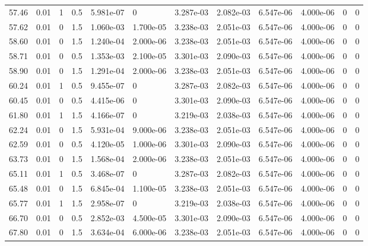 \documentclass[preview]{standalone}
\begin{document}
{{{\begin{tabular}{L{1.2cm}C{1.2cm} C{0.3cm}C{0.5cm} C{1.4cm}C{1.4cm} C{1.4cm}C{1.4cm} C{1.6cm}C{1.6cm} C{1.6cm}C{1.6cm}}
  57.46  &  0.01  & 1     & 0.5 &  5.981e-07  & 0  &  3.287e-03&   2.082e-03& 6.547e-06 & 4.000e-06   &  0 & 0  \\ 
  57.62  &  0.01  & 0     & 1.5 &  1.060e-03  & 1.700e-05  &  3.238e-03&   2.051e-03& 6.547e-06 & 4.000e-06   &  0 & 0  \\ 
  58.60  &  0.01  & 0     & 1.5 &  1.240e-04  & 2.000e-06  &  3.238e-03&   2.051e-03& 6.547e-06 & 4.000e-06   &  0 & 0  \\ 
  58.71  &  0.01  & 0     & 0.5 &  1.353e-03  & 2.100e-05  &  3.301e-03&   2.090e-03& 6.547e-06 & 4.000e-06   &  0 & 0  \\ 
  58.90  &  0.01  & 0     & 1.5 &  1.291e-04  & 2.000e-06  &  3.238e-03&   2.051e-03& 6.547e-06 & 4.000e-06   &  0 & 0  \\ 
  60.24  &  0.01  & 1     & 0.5 &  9.455e-07  & 0  &  3.287e-03&   2.082e-03& 6.547e-06 & 4.000e-06   &  0 & 0  \\ 
  60.45  &  0.01  & 0     & 0.5 &  4.415e-06  & 0  &  3.301e-03&   2.090e-03& 6.547e-06 & 4.000e-06   &  0 & 0  \\ 
  61.80  &  0.01  & 1     & 1.5 &  4.166e-07  & 0  &  3.219e-03&   2.038e-03& 6.547e-06 & 4.000e-06   &  0 & 0  \\ 
  62.24  &  0.01  & 0     & 1.5 &  5.931e-04  & 9.000e-06  &  3.238e-03&   2.051e-03& 6.547e-06 & 4.000e-06   &  0 & 0  \\ 
  62.59  &  0.01  & 0     & 0.5 &  4.120e-05  & 1.000e-06  &  3.301e-03&   2.090e-03& 6.547e-06 & 4.000e-06   &  0 & 0  \\ 
  63.73  &  0.01  & 0     & 1.5 &  1.568e-04  & 2.000e-06  &  3.238e-03&   2.051e-03& 6.547e-06 & 4.000e-06   &  0 & 0  \\ 
  65.11  &  0.01  & 1     & 0.5 &  3.468e-07  & 0  &  3.287e-03&   2.082e-03& 6.547e-06 & 4.000e-06   &  0 & 0  \\ 
  65.48  &  0.01  & 0     & 1.5 &  6.845e-04  & 1.100e-05  &  3.238e-03&   2.051e-03& 6.547e-06 & 4.000e-06   &  0 & 0  \\ 
  65.77  &  0.01  & 1     & 1.5 &  2.958e-07  & 0  &  3.219e-03&   2.038e-03& 6.547e-06 & 4.000e-06   &  0 & 0  \\ 
  66.70  &  0.01  & 0     & 0.5 &  2.852e-03  & 4.500e-05  &  3.301e-03&   2.090e-03& 6.547e-06 & 4.000e-06   &  0 & 0  \\ 
  67.80  &  0.01  & 0     & 1.5 &  3.634e-04  & 6.000e-06  &  3.238e-03&   2.051e-03& 6.547e-06 & 4.000e-06   &  0 & 0  \\ 
\hline 
\end{tabular} 

}}}
\end{document}
